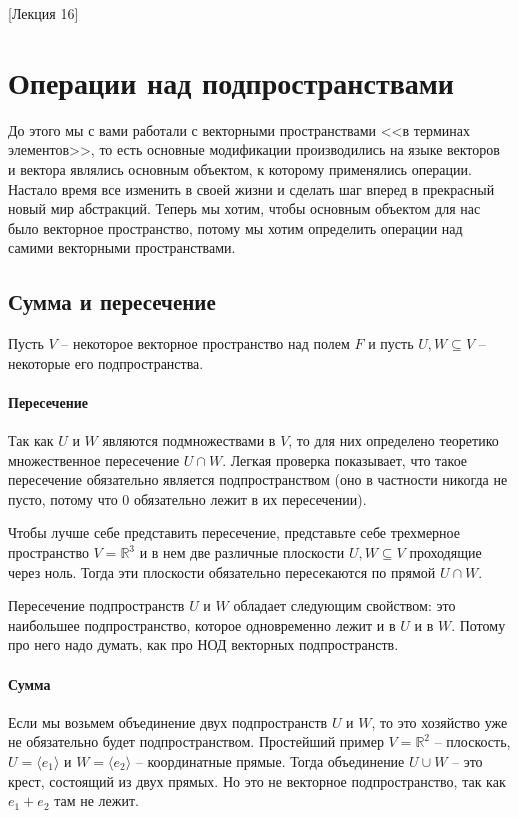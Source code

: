 [Лекция 16]


\newpage
\section{Операции над подпространствами}

До этого мы с вами работали с векторными пространствами <<в терминах элементов>>, то есть основные модификации производились на языке векторов и вектора являлись основным объектом, к которому применялись операции.
Настало время все изменить в своей жизни и сделать шаг вперед в прекрасный новый мир абстракций.
Теперь мы хотим, чтобы основным объектом для нас было векторное пространство, потому мы хотим определить операции над самими векторными пространствами.

\subsection{Сумма и пересечение}

Пусть $V$ -- некоторое векторное пространство над полем $F$ и пусть $U, W \subseteq V$ -- некоторые его подпространства.

\paragraph{Пересечение}

Так как $U$ и $W$ являются подмножествами в $V$, то для них определено теоретико множественное пересечение $U\cap W$.
Легкая проверка показывает, что такое пересечение обязательно является подпространством (оно в частности никогда не пусто, потому что $0$ обязательно лежит в их пересечении).

Чтобы лучше себе представить пересечение, представьте себе трехмерное пространство $V = \mathbb R^3$ и в нем две различные плоскости $U,W\subseteq V$ проходящие через ноль.
Тогда эти плоскости обязательно пересекаются по прямой $U\cap W$.

Пересечение подпространств $U$ и $W$ обладает следующим свойством: это наибольшее подпространство, которое одновременно лежит и в $U$ и в $W$.
Потому про него надо думать, как про НОД векторных подпространств.

\paragraph{Сумма}

Если мы возьмем объединение двух подпространств $U$ и $W$, то это хозяйство уже не обязательно будет подпространством.
Простейший пример $V = \mathbb R^2$ -- плоскость, $U = \langle e_1\rangle$ и $W = \langle e_2 \rangle$ -- координатные прямые.
Тогда объединение $U\cup W$ -- это крест, состоящий из двух прямых.
Но это не векторное подпространство, так как $e_1 + e_2$ там не лежит.

